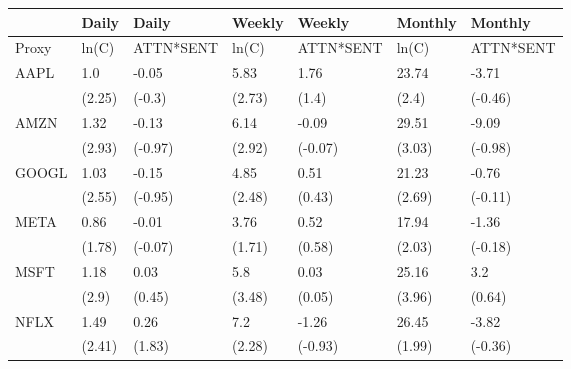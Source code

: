 \begin{tabular}{lllllll}
\toprule
{} &   Daily &      Daily &  Weekly &     Weekly & Monthly &    Monthly \\
\midrule
Proxy &   ln(C) &  ATTN*SENT &   ln(C) &  ATTN*SENT &   ln(C) &  ATTN*SENT \\
AAPL  &     1.0 &      -0.05 &    5.83 &       1.76 &   23.74 &      -3.71 \\
      &  (2.25) &     (-0.3) &  (2.73) &      (1.4) &   (2.4) &    (-0.46) \\
AMZN  &    1.32 &      -0.13 &    6.14 &      -0.09 &   29.51 &      -9.09 \\
      &  (2.93) &    (-0.97) &  (2.92) &    (-0.07) &  (3.03) &    (-0.98) \\
GOOGL &    1.03 &      -0.15 &    4.85 &       0.51 &   21.23 &      -0.76 \\
      &  (2.55) &    (-0.95) &  (2.48) &     (0.43) &  (2.69) &    (-0.11) \\
META  &    0.86 &      -0.01 &    3.76 &       0.52 &   17.94 &      -1.36 \\
      &  (1.78) &    (-0.07) &  (1.71) &     (0.58) &  (2.03) &    (-0.18) \\
MSFT  &    1.18 &       0.03 &     5.8 &       0.03 &   25.16 &        3.2 \\
      &   (2.9) &     (0.45) &  (3.48) &     (0.05) &  (3.96) &     (0.64) \\
NFLX  &    1.49 &       0.26 &     7.2 &      -1.26 &   26.45 &      -3.82 \\
      &  (2.41) &     (1.83) &  (2.28) &    (-0.93) &  (1.99) &    (-0.36) \\
\bottomrule
\end{tabular}
